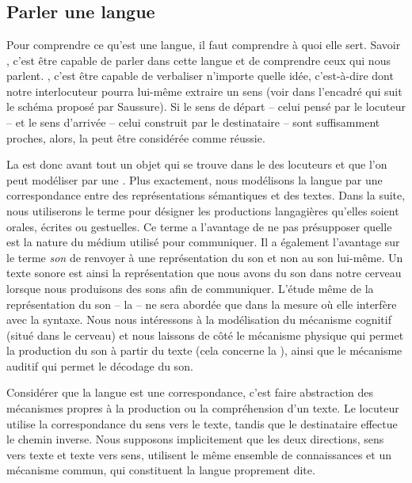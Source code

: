 \chapter{}\label{sec:1.1}

\section{Parler une langue}\label{sec:1.1.0}%

Pour comprendre ce qu’est une langue, il faut comprendre à quoi elle sert. Savoir , c’est être capable de parler dans cette langue et de comprendre ceux qui nous parlent. , c’est être capable de verbaliser n’importe quelle idée, c’est-à-dire  dont notre interlocuteur pourra lui-même extraire un sens (voir dans l’encadré qui suit le schéma proposé par Saussure). Si le sens de départ – celui pensé par le locuteur – et le sens d’arrivée – celui construit par le destinataire – sont suffisamment proches, alors, la  peut être considérée comme réussie.

La  est donc avant tout un objet qui se trouve dans le  des locuteurs et que l’on peut modéliser par une . Plus exactement, nous modélisons la langue par une correspondance entre des représentations sémantiques et des textes. Dans la suite, nous utiliserons le terme  pour désigner les productions langagières qu’elles soient orales, écrites ou gestuelles. Ce terme a l’avantage de ne pas présupposer quelle est la nature du médium utilisé pour communiquer. Il a également l’avantage sur le terme \textit{son} de renvoyer à une représentation du son et non au son lui-même. Un texte sonore est ainsi la représentation que nous avons du son dans notre cerveau lorsque nous produisons des sons afin de communiquer. L’étude même de la représentation du son – la  – ne sera abordée que dans la mesure où elle interfère avec la syntaxe. Nous nous intéressons à la modélisation du mécanisme cognitif (situé dans le cerveau) et nous laissons de côté le mécanisme physique qui permet la production du son à partir du texte (cela concerne la ), ainsi que le mécanisme auditif qui permet le décodage du son.

Considérer que la langue est une correspondance, c’est faire abstraction des mécanismes propres à la production ou la compréhension d’un texte. Le locuteur utilise la correspondance du sens vers le texte, tandis que le destinataire effectue le chemin inverse. Nous supposons implicitement que les deux directions, sens vers texte et texte vers sens, utilisent le même ensemble de connaissances et un mécanisme commun, qui constituent la langue proprement dite.

